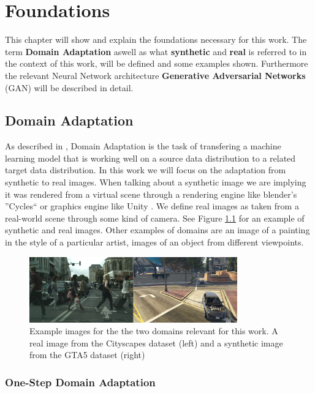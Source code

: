 \chapter{Foundations}
\label{sec:foundations}

This chapter will show and explain the foundations necessary for this work. The term \textbf{Domain Adaptation} aswell as what \textbf{synthetic} and \textbf{real} is referred to in the context of this work, will be defined and some examples shown. Furthermore the relevant Neural Network architecture \textbf{Generative Adversarial Networks} (GAN) will be described in detail.


\section{Domain Adaptation}
As described in \cite{DBLP:journals/corr/Csurka17},
Domain Adaptation is the task of transfering a machine learning model that is working well on a source data distribution to a related target data distribution. In this work we will focus on the adaptation from synthetic to real images. When talking about a synthetic image we are implying it was rendered from a virtual scene through a rendering engine like blender's ''Cycles`` \cite{Cycles} or graphics engine like Unity \cite{Unity}. We define real images as taken from a real-world scene through some kind of camera. See Figure \ref{fig:DA_examples} for an example of synthetic and real images. Other examples of domains are an image of a painting in the style of a particular artist, images of an object from different viewpoints. 

\begin{figure}
	\centering
	 \includegraphics[width=0.8\textwidth]{../images/DA_examples_cityscapes_gta.png}
	\caption{Example images for the the two domains relevant for this work. A real image from the Cityscapes dataset \cite{Cordts_2016_CVPR} (left) and a synthetic image from the GTA5 dataset \cite{Richter_2016_ECCV} (right)}
	\label{fig:DA_examples}
\end{figure}

\subsection{One-Step Domain Adaptation}

